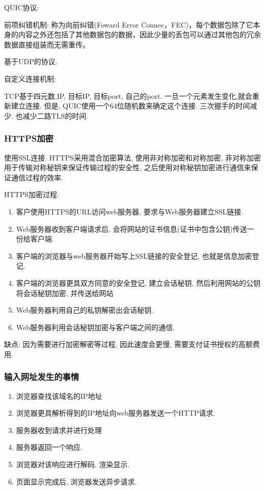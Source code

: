 \documentclass[UTF8]{ctexart}
\begin{document}
QUIC协议: 

前项纠错机制: 称为向前纠错(Foward Error Connec，FEC)，每个数据包除了它本身的内容之外还包括了其他数据包的数据，因此少量的丢包可以通过其他包的冗余数据直接组装而无需重传。

基于UDP的协议. 

自定义连接机制:

TCP基于四元数,IP, 目标IP, 目标port, 自己的port. 一旦一个元素发生变化,就会重新建立连接. 
但是, QUIC使用一个64位随机数来确定这个连接. 三次握手的时间减少. 也减少二路TLS的时间.




\subsubsection{HTTPS加密}
使用SSL连接. HTTPS采用混合加密算法, 使用非对称加密和对称加密, 非对称加密用于传输对称秘钥来保证传输过程的安全性, 之后使用对称秘钥加密进行通信来保证通信过程的效率. 
\par
HTTPS加密过程:
\begin{enumerate}
	\item 客户使用HTTPS的URL访问web服务器, 要求与Web服务器建立SSL链接.	
	\item Web服务器收到客户端请求后, 会将网站的证书信息(证书中包含公钥)传送一份给客户端.
	\item 客户端的浏览器与web服务器开始写上SSL链接的安全登记, 也就是信息加密登记.
	\item 客户端的浏览器更具双方同意的安全登记, 建立会话秘钥, 然后利用网站的公钥将会话秘钥加密, 并传送给网站
	\item Web服务器利用自己的私钥解密出会话秘钥.
	\item Web服务器利用会话秘钥加密与客户端之间的通信.
\end{enumerate}
\par
缺点: 因为需要进行加密解密等过程, 因此速度会更慢, 需要支付证书授权的高额费用.
\subsubsection{输入网址发生的事情}
\begin{enumerate}
	\item 浏览器查找该域名的IP地址
	\item 浏览器更具解析得到的IP地址向web服务器发送一个HTTP请求.
	\item 服务器收到请求并进行处理
	\item 服务器返回一个响应.
	\item 浏览器对该响应进行解码, 渲染显示.
	\item 页面显示完成后, 浏览器发送异步请求.
\end{enumerate}
\end{document}

